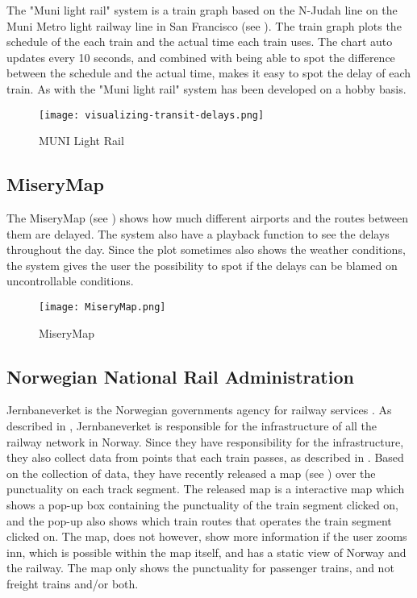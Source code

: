 The "Muni light rail" system is a train graph based on the N-Judah line on the 
Muni Metro light railway line in San Francisco (see ). 
The train graph plots the schedule of the each train and the actual time each 
train uses. The chart auto updates every 10 seconds, and combined with being 
able to spot the difference between the schedule and the actual time, makes it 
easy to spot the delay of each train. As with 
the "Muni light rail" system has been developed on a hobby basis.

\begin{figure}[!htbp]
	\texttt{[image: visualizing-transit-delays.png]}
	\caption[MUNI Light Rail]{MUNI Light Rail \cite{muniLightRail}}
	\label{fig:muniLightRail}
\end{figure}

\subsection{MiseryMap}
\label{sub:subsection_zugmonitor}

The MiseryMap (see ) shows how much different airports and 
the routes between them are delayed. The system also have a playback function 
to see the delays throughout the day. Since the plot sometimes also shows the 
weather conditions, the system gives the user the possibility to spot if the 
delays can be blamed on uncontrollable conditions. 

\begin{figure}[!htbp]
	\texttt{[image: MiseryMap.png]}
	\caption[MiseryMap]{MiseryMap \cite{flightAware:MiseryMap}}
	\label{fig:miserymap}
\end{figure}
 
\subsection{Norwegian National Rail Administration}
\label{sub:subsection_jernbaneverket}

Jernbaneverket is the Norwegian governments agency for railway services 
\cite{jernbaneverketAbout}. As described in , 
Jernbaneverket is responsible for the infrastructure of all the railway 
network in Norway. Since they have responsibility for the infrastructure, 
they also collect data from points that each train passes, as described in 
. Based on the collection of data, they have recently 
released a map (see ) over the punctuality 
on each track segment. The released map is a interactive map which shows a 
pop-up box containing the punctuality of the train segment clicked on, and the 
pop-up also shows which train routes that operates the train segment clicked 
on. The map, does not however, show more information if the user zooms inn, 
which is possible within the map itself, and has a static view of Norway and 
the railway. The map only shows the punctuality for passenger trains, and not 
freight trains and/or both.\\ 

